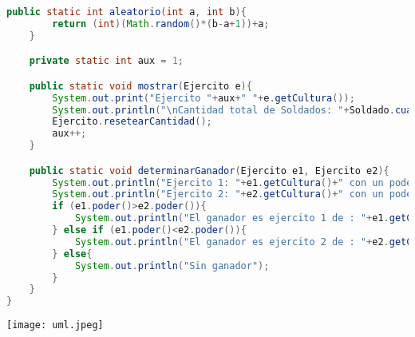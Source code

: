 \documentclass{article}
\begin{document}
\begin{itemize}
\begin{lstlisting}[language=java]
    public static int aleatorio(int a, int b){
        return (int)(Math.random()*(b-a+1))+a;
    }

    private static int aux = 1;

    public static void mostrar(Ejercito e){
        System.out.print("Ejercito "+aux+" "+e.getCultura());
        System.out.println("\nCantidad total de Soldados: "+Soldado.cuantos()+"\n"+"Espadachines: "+Espadachin.cuantos()+"\n"+"Arqueros: "+Arquero.cuantos()+"\n"+"Lanceros: "+Lancero.cuantos()+"\n"+"Caballeros: "+Caballero.cuantos()+"\n");
        Ejercito.resetearCantidad();
        aux++;
    }

    public static void determinarGanador(Ejercito e1, Ejercito e2){
        System.out.println("Ejercito 1: "+e1.getCultura()+" con un poder de "+e1.poder());
        System.out.println("Ejercito 2: "+e2.getCultura()+" con un poder de "+e2.poder());
        if (e1.poder()>e2.poder()){
            System.out.println("El ganador es ejercito 1 de : "+e1.getCultura());
        } else if (e1.poder()<e2.poder()){
            System.out.println("El ganador es ejercito 2 de : "+e2.getCultura());
        } else{
            System.out.println("Sin ganador");
        }
    }
}

        \end{lstlisting}
 
             \texttt{[image: uml.jpeg]}
        
	\end{itemize}
\end{document}
